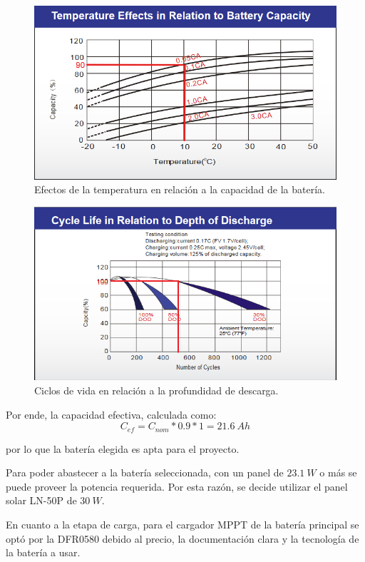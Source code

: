 \begin{figure}[H]
	\centering
	\includegraphics[width=0.9\linewidth]{ImagenesFactibilidad/UL24-12_Ctemp}	
	\caption{Efectos de la temperatura en relación a la capacidad de la batería.}
	\label{fig:ctemp}
\end{figure}

\begin{figure}[H]
	\centering
	\includegraphics[width=0.9\linewidth]{ImagenesFactibilidad/UL24-12_Cdod}	
	\caption{Ciclos de vida en relación a la profundidad de descarga.}
	\label{fig:cdod}
\end{figure}

Por ende, la capacidad efectiva, calculada como:
\begin{equation}
C_{ef} = C_{nom}*0.9*1 = 21.6 \ Ah
\end{equation}

por lo que la batería elegida es apta para el proyecto.


Para poder abastecer a la batería seleccionada, con un panel de $23.1 \ W$ o más se puede proveer la potencia requerida. Por esta razón, se decide utilizar el panel solar LN-50P de $30 \ W$.

En cuanto a la etapa de carga, para el cargador MPPT de la batería principal se optó por la DFR0580 debido al precio, la documentación clara y la tecnología de la batería a usar.
